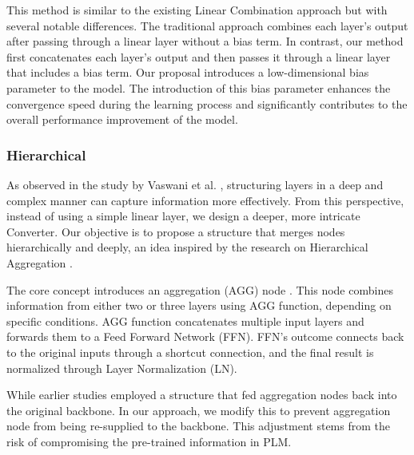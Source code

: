 \documentclass[conference]{IEEEtran}
\begin{document}
This method is similar to the existing Linear Combination approach \cite{dou2018exploiting} but with several notable differences. The traditional approach combines each layer's output after passing through a linear layer without a bias term. In contrast, our method first concatenates each layer's output and then passes it through a linear layer that includes a bias term. Our proposal introduces a low-dimensional bias parameter to the model. The introduction of this bias parameter enhances the convergence speed during the learning process and significantly contributes to the overall performance improvement of the model.

\subsubsection{Hierarchical} 
As observed in the study by Vaswani et al. \cite{vaswani2017attention}, structuring layers in a deep and complex manner can capture information more effectively. From this perspective, instead of using a simple linear layer, we design a deeper, more intricate Converter. Our objective is to propose a structure that merges nodes hierarchically and deeply, an idea inspired by the research on Hierarchical Aggregation \cite{dou2018exploiting}.

The core concept introduces an aggregation (AGG) node . This node combines information from either two or three layers using AGG function, depending on specific conditions. AGG function concatenates multiple input layers and forwards them to a Feed Forward Network (FFN). FFN's outcome connects back to the original inputs through a shortcut connection, and the final result is normalized through Layer Normalization (LN).






While earlier studies \cite{dou2018exploiting} employed a structure that fed aggregation nodes back into the original backbone. In our approach, we modify this to prevent aggregation node from being re-supplied to the backbone. This adjustment stems from the risk of compromising the pre-trained information in PLM.
\end{document}

